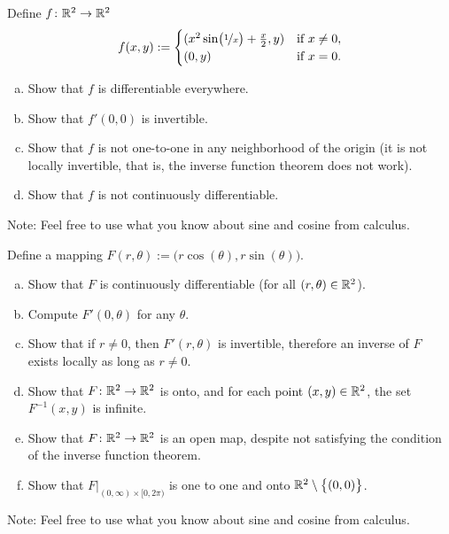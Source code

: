 \begin{samepage}
\begin{exercise}
Define $f \colon {\mathbb{R}}^2 \to {\mathbb{R}}^2$
\begin{equation*}
f(x,y) :=
\begin{cases}
(x^2 \sin \bigl(\nicefrac{1}{x}\bigr) + \frac{x}{2} , y ) & \text{if } x \not= 0, \\
(0,y)                                                     & \text{if } x=0.
\end{cases}
\end{equation*}
\begin{enumerate}[a)]
\item
Show that $f$ is differentiable everywhere.
\item
Show that $f'(0,0)$ is invertible.
\item
Show that $f$ is not one-to-one in any neighborhood of the origin (it is
not locally invertible, that is, the inverse function theorem does not work).
\item
Show that $f$ is not continuously differentiable.
\end{enumerate}
Note: Feel free to use what you know about sine and cosine from calculus.
\end{exercise}
\end{samepage}

\begin{exercise} \label{mv:exercise:polarcoordinates}
Define a mapping $F(r,\theta) := \bigl(r \cos(\theta), r \sin(\theta) \bigr)$.
\begin{enumerate}[a)]
\item
Show that $F$ is continuously differentiable (for all $(r,\theta) \in
{\mathbb{R}}^2$).
\item
Compute $F'(0,\theta)$ for any $\theta$.
\item
Show that if $r \not= 0$, then $F'(r,\theta)$ is invertible, therefore an
inverse of $F$ exists locally as long as $r \not= 0$.
\item
Show that $F \colon {\mathbb{R}}^2 \to {\mathbb{R}}^2$ is onto, and for each point $(x,y) \in
{\mathbb{R}}^2$, the set $F^{-1}(x,y)$ is infinite.
\item
Show that $F \colon {\mathbb{R}}^2 \to {\mathbb{R}}^2$ is an open map, despite not satisfying the condition of the
inverse function theorem.
\item
Show that $F|_{(0,\infty) \times [0,2\pi)}$ is one to one and onto
${\mathbb{R}}^2 \setminus \bigl\{ (0,0) \bigr\}$.
\end{enumerate}
Note: Feel free to use what you know about sine and cosine from calculus.
\end{exercise}

